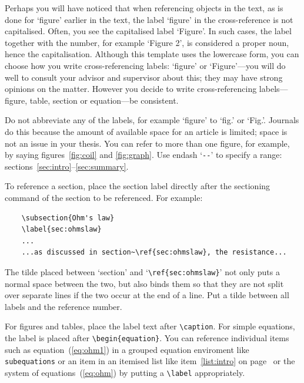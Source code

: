 \documentclass[english, 12pt, a4paper, elec, utf8, a-2b, online]{aaltothesis}
\begin{document}
Perhaps you will have noticed that when referencing objects in the text, as is 
done for `figure' earlier in the text, the label ‘figure’ in the cross-reference
is not capitalised. Often, you see the capitalised label ‘Figure’. In such 
cases, the label together with the number, for example ‘Figure 2’, is 
considered a proper noun, hence the capitalisation. Although this template uses 
the lowercase form, you can choose how you write cross-referencing labels: 
‘figure’ or ‘Figure’---you will do well to consult your advisor and supervisor 
about this; they may have strong opinions on the matter. However you decide to 
write cross-referencing labels---figure, table, section or equation---be 
consistent.

Do not abbreviate any of the labels, for example ‘figure’ to ‘fig.’ or ‘Fig.’. 
Journals do this because the amount of available space for an article is 
limited; space is not an issue in your thesis. You can refer to more than one 
figure, for example, by saying figures~\ref{fig:coil} and \ref{fig:graph}. Use 
endash `\verb+--+' to specify a range: sections~\ref{sec:intro}--\ref{sec:summary}.

To reference a section, place the section label directly after the sectioning 
command of the section to be referenced. For example:
\begin{verbatim}
	\subsection{Ohm's law}
	\label{sec:ohmslaw}
	...
	...as discussed in section~\ref{sec:ohmslaw}, the resistance...
\end{verbatim}
The tilde placed between `section' and `\verb+\ref{sec:ohmslaw}+' not only puts 
a normal space between the two, but also binds them so that they are not split 
over separate lines if the two occur at the end of a line. Put a tilde between 
all labels and the reference number.

For figures and tables, place the label text after \verb+\caption+. For simple 
equations, the label is placed after \verb+\begin{equation}+. You can reference
individual items such as equation~(\ref{eq:ohm1}) in a grouped equation 
enviroment like \verb+subequations+ or an item in an itemised list like 
item~\ref{list:intro} on page~\pageref{list:intro} or the system of 
equations~(\ref{eq:ohm}) by putting a \verb+\label+ appropriately.
\end{document}
